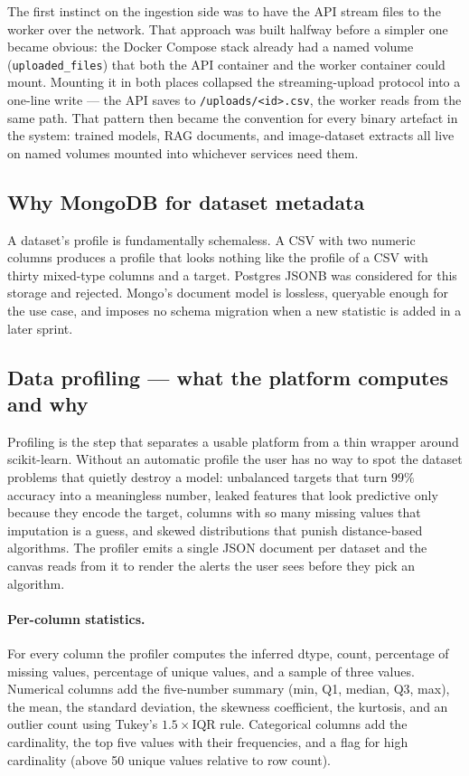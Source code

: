 \documentclass[12pt, a4paper, oneside]{report}
\begin{document}
The first instinct on the ingestion side was to have the API stream
files to the worker over the network. That approach was built halfway
before a simpler one became obvious: the Docker Compose stack already
had a named volume (\texttt{uploaded\_files}) that both the API
container and the worker container could mount. Mounting it in both
places collapsed the streaming-upload protocol into a one-line write
--- the API saves to \texttt{/uploads/<id>.csv}, the worker reads
from the same path. That pattern then became the convention for
every binary artefact in the system: trained models, RAG documents,
and image-dataset extracts all live on named volumes mounted into
whichever services need them.

\subsection{Why MongoDB for dataset metadata}

A dataset's profile is fundamentally schemaless. A CSV with two
numeric columns produces a profile that looks nothing like the
profile of a CSV with thirty mixed-type columns and a target.
Postgres JSONB was considered for this storage and rejected. Mongo's
document model is lossless, queryable enough for the use case, and
imposes no schema migration when a new statistic is added in a later
sprint.

\subsection{Data profiling --- what the platform computes and why}

Profiling is the step that separates a usable platform from a thin
wrapper around scikit-learn. Without an automatic profile the user
has no way to spot the dataset problems that quietly destroy a model:
unbalanced targets that turn $99\%$ accuracy into a meaningless
number, leaked features that look predictive only because they
encode the target, columns with so many missing values that
imputation is a guess, and skewed distributions that punish
distance-based algorithms. The profiler emits a single JSON
document per dataset and the canvas reads from it to render the
alerts the user sees before they pick an algorithm.

\paragraph{Per-column statistics.} For every column the profiler
computes the inferred dtype, count, percentage of missing values,
percentage of unique values, and a sample of three values. Numerical
columns add the five-number summary (min, Q1, median, Q3, max), the
mean, the standard deviation, the skewness coefficient, the kurtosis,
and an outlier count using Tukey's $1.5 \times \text{IQR}$ rule.
Categorical columns add the cardinality, the top five values with
their frequencies, and a flag for high cardinality (above 50 unique
values relative to row count).
\end{document}
